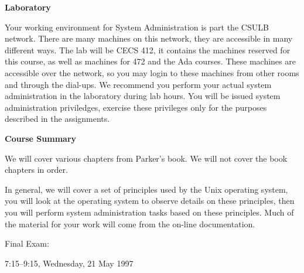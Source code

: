 \vskip 6pt
\centerline{\bf Laboratory}

Your working environment for System Administration is part the CSULB network.
There are many machines on this network, they are accessible in
many different ways.
The lab will be CECS 412, it contains the machines reserved for this course,
as well as machines for 472 and the Ada courses.
These machines are accessible over the network,
so you may login to these machines from other rooms
and through the dial-ups.
We recommend you perform your actual system administration in the laboratory
during lab hours.
You will be issued system administration  priviledges,
exercise these privileges only for the purposes described in the assignments.

\vskip 6pt
\centerline{\bf Course Summary}

We will cover various chapters from Parker's book.
We will not cover the book chapters in order.

In general, we will cover a set of principles used by the Unix operating system,
you will look at the operating system to observe details on these principles,
then you will perform system administration tasks based on these principles.
Much of the material for your work will come from the on-line documentation.

\vskip 6pt
Final Exam: 

7:15--9:15, Wednesday, 21 May 1997

{\parskip=0pt

\def\week#1{\par\hangindent 0.7in {\indent\llap{\bf #1 \enspace}
\ignorespaces}}

}
\bye
